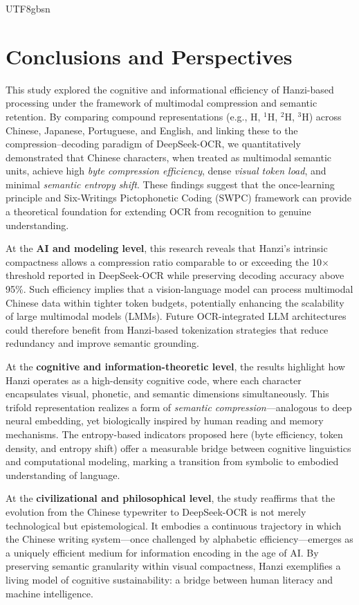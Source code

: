 \documentclass[conference]{IEEEtran}
\begin{document}
\begin{CJK*}{UTF8}{gbsn}
\section{Conclusions and Perspectives}
\label{sec:conclusion}

This study explored the cognitive and informational efficiency of Hanzi-based processing under the framework of multimodal compression and semantic retention. By comparing compound representations (e.g., H, $^{1}$H, $^{2}$H, $^{3}$H) across Chinese, Japanese, Portuguese, and English, and linking these to the compression–decoding paradigm of DeepSeek-OCR, we quantitatively demonstrated that Chinese characters, when treated as multimodal semantic units, achieve high \textit{byte compression efficiency}, dense \textit{visual token load}, and minimal \textit{semantic entropy shift}. These findings suggest that the once-learning principle and Six-Writings Pictophonetic Coding (SWPC) framework can provide a theoretical foundation for extending OCR from recognition to genuine understanding.

At the \textbf{AI and modeling level}, this research reveals that Hanzi’s intrinsic compactness allows a compression ratio comparable to or exceeding the 10$\times$ threshold reported in DeepSeek-OCR while preserving decoding accuracy above 95\%. Such efficiency implies that a vision-language model can process multimodal Chinese data within tighter token budgets, potentially enhancing the scalability of large multimodal models (LMMs). Future OCR-integrated LLM architectures could therefore benefit from Hanzi-based tokenization strategies that reduce redundancy and improve semantic grounding.

At the \textbf{cognitive and information-theoretic level}, the results highlight how Hanzi operates as a high-density cognitive code, where each character encapsulates visual, phonetic, and semantic dimensions simultaneously. This trifold representation realizes a form of \emph{semantic compression}—analogous to deep neural embedding, yet biologically inspired by human reading and memory mechanisms. The entropy-based indicators proposed here (byte efficiency, token density, and entropy shift) offer a measurable bridge between cognitive linguistics and computational modeling, marking a transition from symbolic to embodied understanding of language.

At the \textbf{civilizational and philosophical level}, the study reaffirms that the evolution from the Chinese typewriter to DeepSeek-OCR is not merely technological but epistemological. It embodies a continuous trajectory in which the Chinese writing system—once challenged by alphabetic efficiency—emerges as a uniquely efficient medium for information encoding in the age of AI. By preserving semantic granularity within visual compactness, Hanzi exemplifies a living model of cognitive sustainability: a bridge between human literacy and machine intelligence.


\end{CJK*}
\end{document}
